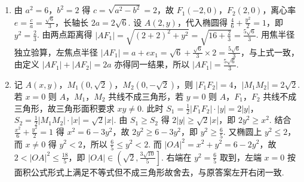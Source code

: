 \begin{solution}
\begin{enumerate}
\item 由 \(a^2=6\)，\(b^2=2\) 得 \(c=\sqrt{a^2-b^2}=2\)，故 \(F_1\left(-2,0\right)\)，\(F_2\left(2,0\right)\)，离心率 \(e=\frac{c}{a}=\frac{\sqrt{6}}{3}\)，长轴长 \(2a=2\sqrt{6}\). 设 \(A\left(2,y\right)\)，代入椭圆得 \(\frac{4}{6}+\frac{y^2}{2}=1\)，即 \(y^2=\frac{2}{3}\). 由两点距离得 \(\left|AF_1\right|=\sqrt{\left(2+2\right)^2+y^2}=\sqrt{16+\frac{2}{3}}=\frac{5\sqrt{6}}{3}\). 用焦半径独立验算，左焦点半径 \(\left|AF_1\right|=a+ex_1=\sqrt{6}+\frac{\sqrt{6}}{3}\times 2=\frac{5\sqrt{6}}{3}\)，与上式一致，由定义 \(\left|AF_1\right|+\left|AF_2\right|=2a\) 亦得同一结果，所以 \(\left|AF_1\right|=\frac{5\sqrt{6}}{3}\).
\item 记 \(A\left(x,y\right)\)，\(M_1\left(0,\sqrt{2}\right)\)，\(M_2\left(0,-\sqrt{2}\right)\)，则 \(\left|F_1F_2\right|=4\)，\(\left|M_1M_2\right|=2\sqrt{2}\). 若 \(x=0\) 则 \(A\)，\(M_1\)，\(M_2\) 共线不成三角形，若 \(y=0\) 则 \(A\)，\(F_1\)，\(F_2\) 共线不成三角形，故三角形面积要求 \(xy\ne 0\). 此时 \(S_1=\frac{1}{2}\left|F_1F_2\right|\cdot \left|y\right|=2\left|y\right|\)，\(S_2=\frac{1}{2}\left|M_1M_2\right|\cdot \left|x\right|=\sqrt{2}\left|x\right|\). 由 \(S_1\ge S_2\) 得 \(2\left|y\right|\ge \sqrt{2}\left|x\right|\)，即 \(2y^2\ge x^2\). 结合 \(\frac{x^2}{6}+\frac{y^2}{2}=1\) 得 \(x^2=6-3y^2\)，故 \(2y^2\ge 6-3y^2\)，即 \(y^2\ge \frac{6}{5}\). 又椭圆上 \(y^2\le 2\)，而 \(x\ne 0\) 得 \(y^2<2\)，所以 \(\frac{6}{5}\le y^2<2\). 而 \(\left|OA\right|^2=x^2+y^2=6-2y^2\)，故 \(2<\left|OA\right|^2\le \frac{18}{5}\)，即 \(\left|OA\right|\in \left(\sqrt{2},\frac{3\sqrt{10}}{5}\right]\). 右端在 \(y^2=\frac{6}{5}\) 取到，左端 \(x=0\) 按面积公式形式上满足不等式但不成三角形故舍去，与原答案左开右闭一致.

\end{enumerate}
\end{solution}
